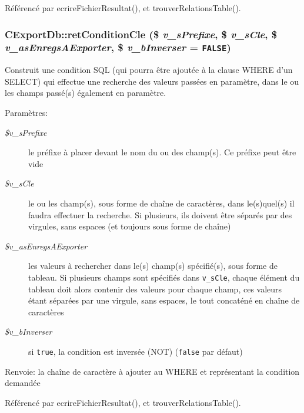 Référencé par ecrireFichierResultat(), et trouverRelationsTable().
\subsubsection{\setlength{\rightskip}{0pt plus 5cm}CExportDb::retConditionCle (\$ {\em v\_\-sPrefixe}, \/  \$ {\em v\_\-sCle}, \/  \$ {\em v\_\-asEnregsAExporter}, \/  \$ {\em v\_\-bInverser} = {\tt FALSE})}\label{class_c_export_db_36d5dc456ed84867e3d6642055a1bb0a}


Construit une condition SQL (qui pourra être ajoutée à la clause WHERE d'un SELECT) qui effectue une recherche des valeurs passées en paramètre, dans le ou les champs passé(s) également en paramètre. 

\begin{Desc}
\item[Paramètres:]
\begin{description}
\item[{\em \$v\_\-sPrefixe}]le préfixe à placer devant le nom du ou des champ(s). Ce préfixe peut être vide \item[{\em \$v\_\-sCle}]le ou les champ(s), sous forme de chaîne de caractères, dans le(s)quel(s) il faudra effectuer la recherche. Si plusieurs, ils doivent être séparés par des virgules, sans espaces (et toujours sous forme de chaîne) \item[{\em \$v\_\-asEnregsAExporter}]les valeurs à rechercher dans le(s) champ(s) spécifié(s), sous forme de tableau. Si plusieurs champs sont spécifiés dans {\tt v\_\-sCle}, chaque élément du tableau doit alors contenir des valeurs pour chaque champ, ces valeurs étant séparées par une virgule, sans espaces, le tout concaténé en chaîne de caractères\item[{\em \$v\_\-bInverser}]si {\tt true}, la condition est inversée (NOT) ({\tt false} par défaut)\end{description}
\end{Desc}
\begin{Desc}
\item[Renvoie:]la chaîne de caractère à ajouter au WHERE et représentant la condition demandée \end{Desc}


Référencé par ecrireFichierResultat(), et trouverRelationsTable().
